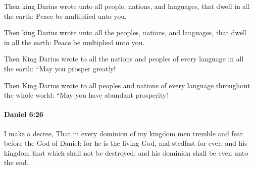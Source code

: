 			Then king Darius wrote unto all people, nations, and languages, that dwell in all the earth; Peace be multiplied unto you.

			\begin{versebox}
					\item[BHS] 
					\item[LXX] 
					\item[ASV] Then king Darius wrote unto all the peoples, nations, and languages, that dwell in all the earth: Peace be multiplied unto you.
					\item[NIV] Then King Darius wrote to all the nations and peoples of every language in all the earth: “May you prosper greatly!
					\item[NRSV] Then King Darius wrote to all peoples and nations of every language throughout the whole world: “May you have abundant prosperity!
			\end{versebox}

		\paragraph{Daniel 6:26} %
			\label{DANIEL-6-26}

			I make a decree, That in every dominion of my kingdom men tremble and fear before the God of Daniel: for he is the living God, and stedfast for ever, and his kingdom that which shall not be destroyed, and his dominion shall be even unto the end.

